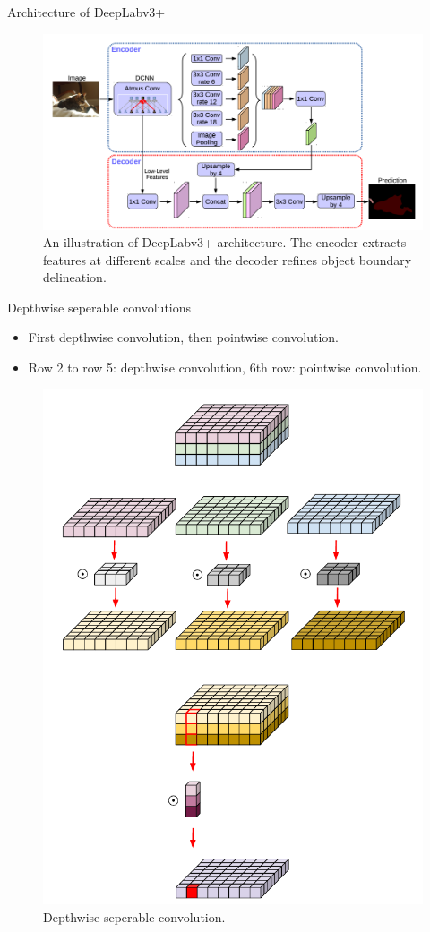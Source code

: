 \documentclass{beamer}
\begin{document}
\begin{frame}{Architecture of DeepLabv3+}
	
	\begin{figure}
		\centering
		\includegraphics[width=1\linewidth]{images/deepLabv4}
		\caption{An illustration of DeepLabv3+ architecture. The encoder extracts features at different scales and the decoder refines object boundary delineation.}
		\label{Fig:deepLabv4}
	\end{figure}

\end{frame}


\begin{frame}{Depthwise seperable convolutions}
	
	\begin{itemize}
		\item First depthwise convolution, then pointwise convolution.
		\item Row 2 to row 5: depthwise convolution, 6th row: pointwise convolution.
	\end{itemize}
	 
	\begin{figure}
		\centering
		\includegraphics[width=.3\linewidth]{images/depthwise}
		\caption{Depthwise seperable convolution.}
		\label{Fig:depthwise}
	\end{figure}

\end{frame}
\end{document}
